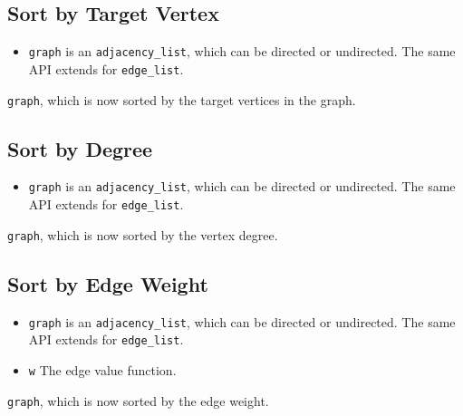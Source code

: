 \subsection{Sort by Target Vertex}
{\small
      
}
\begin{itemdescr}
    \pnum\preconditions
    \begin{itemize}
          \item
                \lstinline{graph} is an \lstinline{adjacency_list}, which can be directed or undirected. The same API extends for \lstinline{edge_list}.
    \end{itemize}
    \pnum\effects \lstinline{graph}, which is now sorted by the target vertices in the graph.
\end{itemdescr}

\subsection{Sort by Degree}
{\small
      
}
\begin{itemdescr}
    \pnum\preconditions
    \begin{itemize}
          \item
                \lstinline{graph} is an \lstinline{adjacency_list}, which can be directed or undirected. The same API extends for \lstinline{edge_list}.
    \end{itemize}
    \pnum\effects \lstinline{graph}, which is now sorted by the vertex degree.
\end{itemdescr}

\subsection{Sort by Edge Weight}
{\small
      
}
\begin{itemdescr}
    \pnum\preconditions
    \begin{itemize}
          \item
                \lstinline{graph} is an \lstinline{adjacency_list}, which can be directed or undirected. The same API extends for \lstinline{edge_list}.
          \item
                \lstinline{w} The edge value function.
    \end{itemize}
    \pnum\effects \lstinline{graph}, which is now sorted by the edge weight.
\end{itemdescr}

